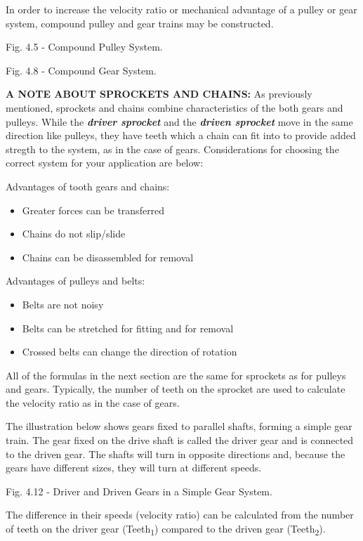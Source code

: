\documentclass[
]{book}
\providecommand{\tightlist}{%
  \setlength{\itemsep}{0pt}\setlength{\parskip}{0pt}}
\begin{document}
In order to increase the velocity ratio or mechanical advantage of a pulley or gear system, compound pulley and gear trains may be constructed.

Fig. 4.5 - Compound Pulley System.

Fig. 4.8 - Compound Gear System.

\textbf{A NOTE ABOUT SPROCKETS AND CHAINS:} As previously mentioned, sprockets and chains combine characteristics of the both gears and pulleys. While the \textbf{\emph{driver sprocket}} and the \textbf{\emph{driven sprocket}} move in the same direction like pulleys, they have teeth which a chain can fit into to provide added stregth to the system, as in the case of gears. Considerations for choosing the correct system for your application are below:

Advantages of tooth gears and chains:

\begin{itemize}
\tightlist
\item
  Greater forces can be transferred
\item
  Chains do not slip/slide
\item
  Chains can be disassembled for removal
\end{itemize}

Advantages of pulleys and belts:

\begin{itemize}
\tightlist
\item
  Belts are not noisy
\item
  Belts can be stretched for fitting and for removal
\item
  Crossed belts can change the direction of rotation
\end{itemize}

All of the formulas in the next section are the same for sprockets as for pulleys and gears. Typically, the number of teeth on the sprocket are used to calculate the velocity ratio as in the case of gears.

The illustration below shows gears fixed to parallel shafts, forming a simple gear train. The gear fixed on the drive shaft is called the driver gear and is connected to the driven gear. The shafts will turn in opposite directions and, because the gears have different sizes, they will turn at different speeds.

Fig. 4.12 - Driver and Driven Gears in a Simple Gear System.

The difference in their speeds (velocity ratio) can be calculated from the number of teeth on the driver gear (Teeth\textsubscript{1}) compared to the driven gear (Teeth\textsubscript{2}).
\end{document}
